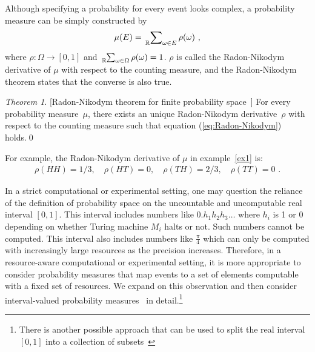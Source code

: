 \documentclass{article}
\theoremstyle{remark}
\newtheorem{thm}{Theorem}
\newcommand{\pmeas}{\ensuremath{\mu}}
\newcommand{\yutsung}[1]{\fbox{\begin{minipage}{0.9\textwidth}\color{purple}{Yu-Tsung says: #1}\end{minipage}}}
\newcommand{\amr}[1]{\fbox{\begin{minipage}{0.9\textwidth}\color{green}{Amr says: #1}\end{minipage}}}
\begin{document}
Although specifying a probability for every event looks complex, a
probability measure can be simply constructed by 
\begin{equation}
\pmeas(E)=\sideset{_{\mathbb{R}}}{_{\omega\in E}}\sum\rho(\omega)\textrm{ ,}\label{eq:Radon-Nikodym}
\end{equation}
where $\rho:\Omega\rightarrow[0,1]$ and $\tensor*[_{\mathbb{R}}]{\sum}{_{\omega\in\Omega}}\rho(\omega)=1$.
$\rho$ is called the Radon-Nikodym derivative of $\pmeas$ with respect
to the counting measure, and the Radon-Nikodym theorem states that
the converse is also true.

\begin{thm}{[}Radon-Nikodym theorem for finite probability space~\cite{Nikodym1930,Kolmogorov1950,Folland2013,Swart2013}{]}
For every probability measure~$\pmeas$, there exists an unique Radon-Nikodym
derivative~$\rho$ with respect to the counting measure such that
equation (\ref{eq:Radon-Nikodym}) holds.\qed\end{thm}

For example, the Radon-Nikodym derivative of $\pmeas$ in example~\ref{ex1}
is: 
\[
\begin{array}{rcl}
\rho\left(HH\right)=1/3,\quad\rho\left(HT\right)=0,\quad\rho\left(TH\right)=2/3,\quad\rho\left(TT\right)=0\textrm{ .}\end{array}
\]

In a strict computational or experimental setting, one may question
the reliance of the definition of probability space on the uncountable
and uncomputable real interval $[0,1]$. This interval includes numbers
like $0.h_1h_2h_3\ldots$ where $h_i$ is 1 or 0 depending on whether
Turing machine $M_i$ halts or not. Such numbers cannot be
computed. This interval also includes numbers like $\frac{\pi}{4}$
which can only be computed with increasingly large resources as the
precision increases.
Therefore, in a resource-aware computational or experimental setting,
it is more appropriate to consider probability measures that map
events to a set of elements computable with a fixed set of
resources. We expand on this observation and then consider
interval-valued probability
measures~\cite{Dempster1967,Shafer1976,JamisonLodwick2004}
in detail.\footnote{There is another possible approach that can be
  used to split the real interval $[0,1]$ into a collection of
  subsets~\cite{PuriRalescu1983} \amr{need to explain the
    connection and why we are not using it.}}
\end{document}
